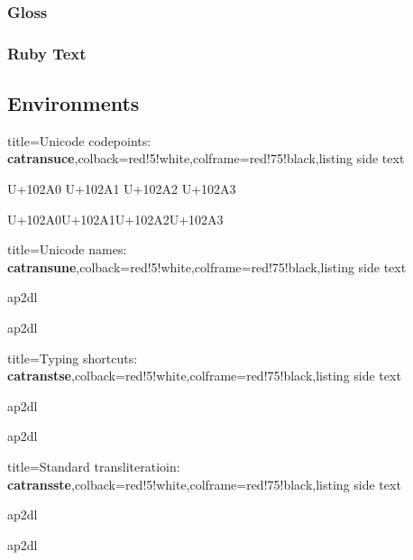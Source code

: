 \documentclass{article}
\newcommand\bqq[1]{\begin{quotation}#1\end{quotation}}
\begin{document}
\subsubsection{Gloss}
\bqq{}

\subsubsection{Ruby Text}
\bqq{}

\subsection{Environments}

\bigskip
\begin{tcblisting}{title={{\sffamily Unicode codepoints: \bfseries\textcolor{blue!10}{catransuce}}},colback=red!5!white,colframe=red!75!black,listing side text}
\begin{catransuce}
U+102A0 U+102A1 U+102A2 U+102A3

U+102A0U+102A1U+102A2U+102A3
\end{catransuce}
\end{tcblisting}

\bigskip
\begin{tcblisting}{title={{\sffamily Unicode names: \bfseries\textcolor{blue!10}{catransune}}},colback=red!5!white,colframe=red!75!black,listing side text}
\begin{catransune}
ap2dl

ap2dl
\end{catransune}
\end{tcblisting}

\bigskip
\begin{tcblisting}{title={{\sffamily Typing shortcuts: \bfseries\textcolor{blue!10}{catranstse}}},colback=red!5!white,colframe=red!75!black,listing side text}
\begin{catranstse}
ap2dl

ap2dl
\end{catranstse}
\end{tcblisting}

\bigskip
\begin{tcblisting}{title={{\sffamily Standard transliteratioin: \bfseries\textcolor{blue!10}{catransste}}},colback=red!5!white,colframe=red!75!black,listing side text}
\begin{catransste}
ap2dl

ap2dl
\end{catransste}
\end{tcblisting}
\end{document}
